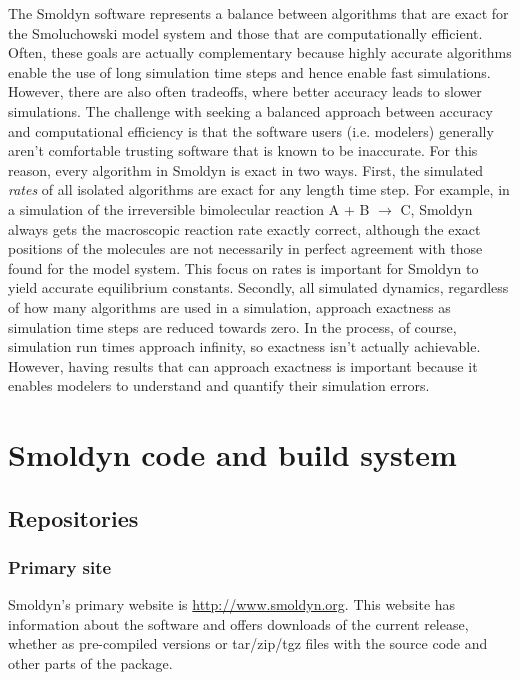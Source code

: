 \documentclass {scrbook}
\begin{document}
The Smoldyn software represents a balance between algorithms that are exact for the Smoluchowski model system and those that are computationally efficient. Often, these goals are actually complementary because highly accurate algorithms enable the use of long simulation time steps and hence enable fast simulations. However, there are also often tradeoffs, where better accuracy leads to slower simulations. The challenge with seeking a balanced approach between accuracy and computational efficiency is that the software users (i.e. modelers) generally aren't comfortable trusting software that is known to be inaccurate. For this reason, every algorithm in Smoldyn is exact in two ways. First, the simulated \emph{rates} of all isolated algorithms are exact for any length time step. For example, in a simulation of the irreversible bimolecular reaction A + B $\rightarrow$ C, Smoldyn always gets the macroscopic reaction rate exactly correct, although the exact positions of the molecules are not necessarily in perfect agreement with those found for the model system. This focus on rates is important for Smoldyn to yield accurate equilibrium constants. Secondly, all simulated dynamics, regardless of how many algorithms are used in a simulation, approach exactness as simulation time steps are reduced towards zero. In the process, of course, simulation run times approach infinity, so exactness isn't actually achievable. However, having results that can approach exactness is important because it enables modelers to understand and quantify their simulation errors.


\chapter{Smoldyn code and build system}

\section{Repositories}

\subsection{Primary site}

Smoldyn's primary website is \url{http://www.smoldyn.org}. This website has information about the software and offers downloads of the current release, whether as pre-compiled versions or tar/zip/tgz files with the source code and other parts of the package.
\end{document}
